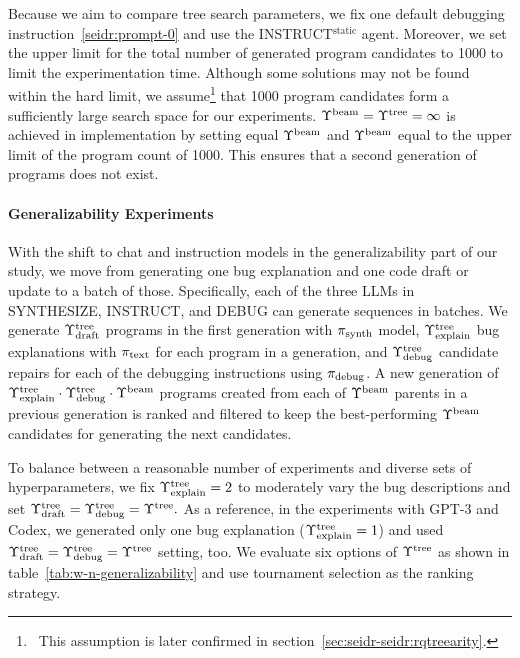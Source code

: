 Because we aim to compare tree search parameters, we fix one default debugging instruction~\ref{seidr:prompt-0} and use the INSTRUCT$^{\text{static}}$ agent.  
Moreover, we set the upper limit for the total number of generated program candidates to 1000 to limit the experimentation time. 
Although some solutions may not be found within the hard limit, we assume\footnote{~This assumption is later confirmed in section~\ref{sec:seidr-seidr:rqtreearity}.} that 1000 program candidates form a sufficiently large search space for our experiments.
$\Upsilon^\text{beam}{} = \Upsilon^\text{tree}{} = \infty$ is achieved in implementation by setting equal $\Upsilon^\text{beam}{}$ and $\Upsilon^\text{beam}{}$ equal to the upper limit of the program count of 1000.
This ensures that a second generation of programs does not exist.


\paragraph{Generalizability Experiments}
\label{sec:seidr-tree arity-ollama} 
With the shift to chat and instruction models in the generalizability part of our study, we move from generating one bug explanation and one code draft or update to a batch of those. 
Specifically, each of the three LLMs in SYNTHESIZE, INSTRUCT, and DEBUG  can generate sequences in batches. 
We generate $\Upsilon^\text{tree}_\text{draft}$ programs in the first generation with $ \pi_\text{synth} $ model, $\Upsilon^\text{tree}_\text{explain}$ bug explanations with $ \pi_\text{text} $ for each program in a generation, and $\Upsilon^\text{tree}_\text{debug}$ candidate repairs for each of the debugging instructions using $ \pi_\text{debug} $.
A new generation of $\Upsilon^\text{tree}_\text{explain} \cdot \Upsilon^\text{tree}_\text{debug} \cdot \Upsilon^\text{beam}{}$ programs created from each of $ \Upsilon^\text{beam}{}$ parents in a previous generation is ranked and filtered to keep the best-performing $\Upsilon^\text{beam}{}$ candidates for generating the next candidates. 

To balance between a reasonable number of experiments and diverse sets of hyperparameters, we fix $\Upsilon^\text{tree}_\text{explain}=2$ to moderately vary the bug descriptions and set $\Upsilon^\text{tree}_\text{draft} = \Upsilon^\text{tree}_\text{debug} = \Upsilon^\text{tree}{}.$
As a reference, in the experiments with GPT-3 and Codex, we generated only one bug explanation ($\Upsilon^\text{tree}_\text{explain} = 1$) and used $\Upsilon^\text{tree}_\text{draft} = \Upsilon^\text{tree}_\text{debug} = \Upsilon^\text{tree}{}$ setting, too. 
We evaluate six options of $\Upsilon^\text{tree}{}$ 
as shown in table~\ref{tab:w-n-generalizability} and use tournament selection as the ranking strategy. 

